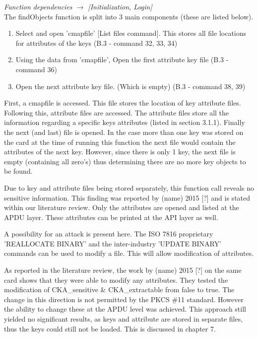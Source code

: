 \documentclass[bsc,frontabs,twoside,singlespacing,parskip,deptreport]{infthesis}     %
\begin{document}
\textit{Function dependencies $\rightarrow$ [Initialization, Login]}\\


The findObjects function is split into 3 main components (these are listed below).

\begin{enumerate}
\item Select and open 'cmapfile' [List files command]. This stores all file locations for attributes of the keys (B.3 - command 32, 33, 34)
\item Using the data from 'cmapfile', Open the first attribute key file (B.3 - command 36)
\item Open the next attribute key file. (Which is empty) (B.3 - command 38, 39)\\
\end{enumerate}


First, a cmapfile is accessed. This file stores the location of key attribute files. Following this, attribute files are accessed. The attribute files store all the information regarding a specific keys attributes (listed in section 3.1.1). Finally the next (and last) file is opened. In the case more than one key was stored on the card at the time of running this function the next file would contain the attributes of the next key. However, since there is only 1 key, the next file is empty (containing all zero's) thus determining there are no more key objects to be found.

Due to key and attribute files being stored separately, this function call reveals no sensitive information. This finding was reported by (name) 2015 [?] and is stated within our literature review. Only the attributes are opened and listed at the APDU layer. These attributes can be printed at the API layer as well.

A possibility for an attack is present here. The ISO 7816 proprietary 'REALLOCATE BINARY' and the inter-industry 'UPDATE BINARY' commands can be used to modify a file. This will allow modification of attributes. 

As reported in the literature review, the work by (name) 2015 [?] on the same card shows that they were able to modify any attributes. They tested the modification of CKA\_sensitive \& CKA\_extractable from false to true. The change in this direction is not permitted by the PKCS \#11 standard. However the ability to change these at the APDU level was achieved. This approach still yielded no significant results, as keys and attribute are stored in separate files, thus the keys could still not be loaded. This is discussed in chapter 7.
\end{document}
